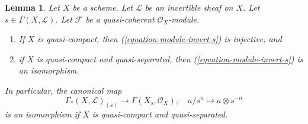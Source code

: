 \documentclass{stacks-project}
\newenvironment{reference}{\comment}{\endcomment}
\theoremstyle{plain}
\newtheorem{lemma}[subsection]{Lemma}
\theoremstyle{definition}
\theoremstyle{remark}
\numberwithin{equation}{subsection}
\begin{document}
\begin{lemma}
\label{lemma-invert-s-sections}
\begin{reference}
\cite[Section 6.8]{EGA1-second}
\end{reference}
Let $X$ be a scheme. Let $\mathcal{L}$ be an invertible sheaf on $X$.
Let $s \in \Gamma(X, \mathcal{L})$. Let $\mathcal{F}$ be a quasi-coherent
$\mathcal{O}_X$-module.
\begin{enumerate}
\item If $X$ is quasi-compact, then (\ref{equation-module-invert-s})
is injective, and
\item if $X$ is quasi-compact and quasi-separated, then
(\ref{equation-module-invert-s}) is an isomorphism.
\end{enumerate}
In particular, the canonical map
$$
\Gamma_*(X, \mathcal{L})_{(s)}
\longrightarrow
\Gamma(X_s, \mathcal{O}_X),\quad
a/s^n \longmapsto a \otimes s^{-n}
$$
is an isomorphism if $X$ is quasi-compact and quasi-separated.
\end{lemma}
\end{document}
